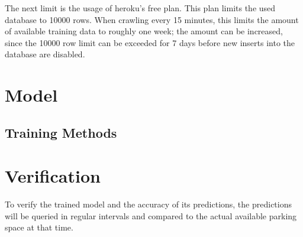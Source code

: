 The next limit is the usage of heroku's free plan. This plan limits the used database to 10000 rows. When crawling every 15 minutes, this limits the amount of available training data to roughly one week; the amount can be increased, since the 10000 row limit can be exceeded for 7 days before new inserts into the database are disabled.


\section{Model}
\subsection{Training Methods} 

\section{Verification}
To verify the trained model and the accuracy of its predictions, the predictions will be queried in regular intervals and compared to the actual available parking space at that time. 


  



